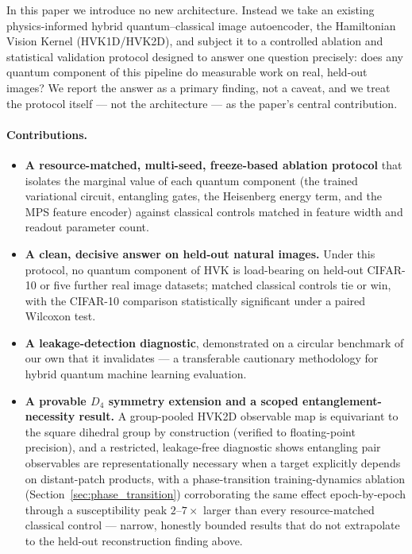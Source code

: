 \documentclass[journal]{IEEEtran}
\begin{document}
In this paper we introduce no new architecture. Instead we take an existing physics-informed hybrid quantum--classical image autoencoder, the Hamiltonian Vision Kernel (HVK1D/HVK2D), and subject it to a controlled ablation and statistical validation protocol designed to answer one question precisely: does any quantum component of this pipeline do measurable work on real, held-out images? We report the answer as a primary finding, not a caveat, and we treat the protocol itself --- not the architecture --- as the paper's central contribution.

\paragraph{Contributions.}
\begin{itemize}
    \item \textbf{A resource-matched, multi-seed, freeze-based ablation protocol} that isolates the marginal value of each quantum component (the trained variational circuit, entangling gates, the Heisenberg energy term, and the MPS feature encoder) against classical controls matched in feature width and readout parameter count.
    \item \textbf{A clean, decisive answer on held-out natural images.} Under this protocol, no quantum component of HVK is load-bearing on held-out CIFAR-10 or five further real image datasets; matched classical controls tie or win, with the CIFAR-10 comparison statistically significant under a paired Wilcoxon test.
    \item \textbf{A leakage-detection diagnostic}, demonstrated on a circular benchmark of our own that it invalidates --- a transferable cautionary methodology for hybrid quantum machine learning evaluation.
    \item \textbf{A provable $D_4$ symmetry extension and a scoped entanglement-necessity result.} A group-pooled HVK2D observable map is equivariant to the square dihedral group by construction (verified to floating-point precision), and a restricted, leakage-free diagnostic shows entangling pair observables are representationally necessary when a target explicitly depends on distant-patch products, with a phase-transition training-dynamics ablation (Section~\ref{sec:phase_transition}) corroborating the same effect epoch-by-epoch through a susceptibility peak $2$--$7\times$ larger than every resource-matched classical control --- narrow, honestly bounded results that do not extrapolate to the held-out reconstruction finding above.
\end{itemize}
\end{document}
